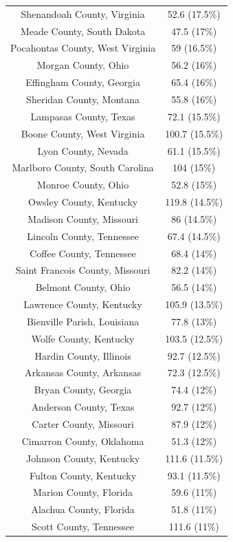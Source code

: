 \begin{table}[ht]
\begin{tabular}{cc}
  Shenandoah County, Virginia & 52.6 (17.5\%) \\ 
  Meade County, South Dakota & 47.5 (17\%) \\ 
  Pocahontas County, West Virginia & 59 (16.5\%) \\ 
  Morgan County, Ohio & 56.2 (16\%) \\ 
  Effingham County, Georgia & 65.4 (16\%) \\ 
  Sheridan County, Montana & 55.8 (16\%) \\ 
  Lampasas County, Texas & 72.1 (15.5\%) \\ 
  Boone County, West Virginia & 100.7 (15.5\%) \\ 
  Lyon County, Nevada & 61.1 (15.5\%) \\ 
  Marlboro County, South Carolina & 104 (15\%) \\ 
  Monroe County, Ohio & 52.8 (15\%) \\ 
  Owsley County, Kentucky & 119.8 (14.5\%) \\ 
  Madison County, Missouri & 86 (14.5\%) \\ 
  Lincoln County, Tennessee & 67.4 (14.5\%) \\ 
  Coffee County, Tennessee & 68.4 (14\%) \\ 
  Saint Francois County, Missouri & 82.2 (14\%) \\ 
  Belmont County, Ohio & 56.5 (14\%) \\ 
  Lawrence County, Kentucky & 105.9 (13.5\%) \\ 
  Bienville Parish, Louisiana & 77.8 (13\%) \\ 
  Wolfe County, Kentucky & 103.5 (12.5\%) \\ 
  Hardin County, Illinois & 92.7 (12.5\%) \\ 
  Arkansas County, Arkansas & 72.3 (12.5\%) \\ 
  Bryan County, Georgia & 74.4 (12\%) \\ 
  Anderson County, Texas & 92.7 (12\%) \\ 
  Carter County, Missouri & 87.9 (12\%) \\ 
  Cimarron County, Oklahoma & 51.3 (12\%) \\ 
  Johnson County, Kentucky & 111.6 (11.5\%) \\ 
  Fulton County, Kentucky & 93.1 (11.5\%) \\ 
  Marion County, Florida & 59.6 (11\%) \\ 
  Alachua County, Florida & 51.8 (11\%) \\ 
  Scott County, Tennessee & 111.6 (11\%) \\ 

\end{tabular}
\end{table}
